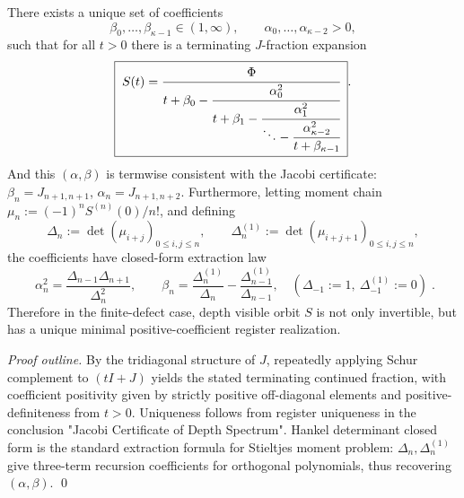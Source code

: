 \begin{proposition}\label{con:xi-terminating-jfraction-uniqueness}
There exists a unique set of coefficients
\[
\beta_0,\dots,\beta_{\kappa-1}\in(1,\infty),
\qquad
\alpha_0,\dots,\alpha_{\kappa-2}>0,
\]
such that for all \(t>0\) there is a terminating \texorpdfstring{$J$}{J}-fraction expansion
\[
\boxed{\;
S(t)
=\cfrac{\Phi}{t+\beta_0-\cfrac{\alpha_0^2}{t+\beta_1-\cfrac{\alpha_1^2}{\ddots-\cfrac{\alpha_{\kappa-2}^2}{t+\beta_{\kappa-1}}}}}\; }.
\]
And this \((\alpha,\beta)\) is termwise consistent with the Jacobi certificate: \(\beta_n=J_{n+1,n+1}\), \(\alpha_n=J_{n+1,n+2}\).
Furthermore, letting moment chain \(\mu_n:=(-1)^n S^{(n)}(0)/n!\), and defining
\[
\Delta_n:=\det(\mu_{i+j})_{0\le i,j\le n},
\qquad
\Delta_n^{(1)}:=\det(\mu_{i+j+1})_{0\le i,j\le n},
\]
the coefficients have closed-form extraction law
\[
\boxed{\;
\alpha_n^2=\frac{\Delta_{n-1}\Delta_{n+1}}{\Delta_n^2},
\qquad
\beta_n=\frac{\Delta_n^{(1)}}{\Delta_n}-\frac{\Delta_{n-1}^{(1)}}{\Delta_{n-1}},
\quad
(\Delta_{-1}:=1,\ \Delta_{-1}^{(1)}:=0)\; }.
\]
Therefore in the finite-defect case, depth visible orbit \(S\) is not only invertible, but has a unique minimal positive-coefficient register realization.
\end{proposition}
\begin{proof}[Proof outline]
By the tridiagonal structure of \(J\), repeatedly applying Schur complement to \((tI+J)\) yields the stated terminating continued fraction, with coefficient positivity given by strictly positive off-diagonal elements and positive-definiteness from \(t>0\).
Uniqueness follows from register uniqueness in the conclusion "Jacobi Certificate of Depth Spectrum".
Hankel determinant closed form is the standard extraction formula for Stieltjes moment problem: \(\Delta_n,\Delta_n^{(1)}\) give three-term recursion coefficients for orthogonal polynomials, thus recovering \((\alpha,\beta)\). \qed
\end{proof}

